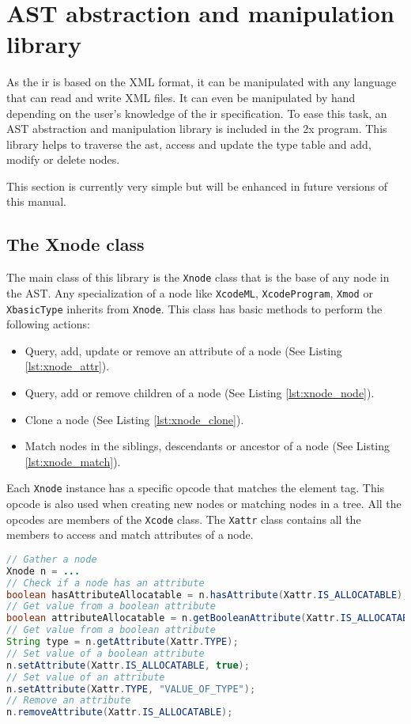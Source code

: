 \chapter{\xcodeml AST abstraction and manipulation library }
\label{chapter:astmanip}
As the \xcodemlf \gls{ir} is based on the XML format, it can be manipulated with
any language that can read and write XML files. It can even be manipulated by
hand depending on the user's knowledge of the \xcodemlf \gls{ir} specification.
To ease this task, an AST abstraction and manipulation library is included 
in the \cx2x program. This library helps to traverse the \gls{ast}, access and
update the type table and add, modify or delete nodes.

This section is currently very simple but will be enhanced in future versions
of this manual.

\section{The Xnode class}
The main class of this library is the \lstinline|Xnode| class that is the base
of any node in the AST. 
Any specialization of a node like \lstinline|XcodeML|, 
\lstinline|XcodeProgram|, \lstinline|Xmod| or \lstinline|XbasicType| inherits 
from \lstinline|Xnode|.
This class has basic methods to perform the following actions:
\begin{itemize}
\item Query, add, update or remove an attribute of a node 
      (See Listing \ref{lst:xnode_attr}).
\item Query, add or remove children of a node (See Listing \ref{lst:xnode_node}).
\item Clone a node (See Listing \ref{lst:xnode_clone}).
\item Match nodes in the siblings, descendants or ancestor of a node 
      (See Listing \ref{lst:xnode_match}).
\end{itemize}

Each \lstinline|Xnode| instance has a specific opcode that matches the \xcodemlf 
element tag.
This opcode is also used when creating new nodes or matching nodes in a tree.
All the opcodes are members of the \lstinline|Xcode| class.
The \lstinline|Xattr| class contains all the members to access and match 
attributes of a node. 

\begin{lstlisting}[label=lst:xnode_attr, language=Java, caption=XtypeTable]
// Gather a node
Xnode n = ...
// Check if a node has an attribute
boolean hasAttributeAllocatable = n.hasAttribute(Xattr.IS_ALLOCATABLE);
// Get value from a boolean attribute
boolean attributeAllocatable = n.getBooleanAttribute(Xattr.IS_ALLOCATABLE);
// Get value from a boolean attribute
String type = n.getAttribute(Xattr.TYPE);
// Set value of a boolean attribute
n.setAttribute(Xattr.IS_ALLOCATABLE, true);
// Set value of an attribute
n.setAttribute(Xattr.TYPE, "VALUE_OF_TYPE");
// Remove an attribute
n.removeAttribute(Xattr.IS_ALLOCATABLE);
\end{lstlisting}

